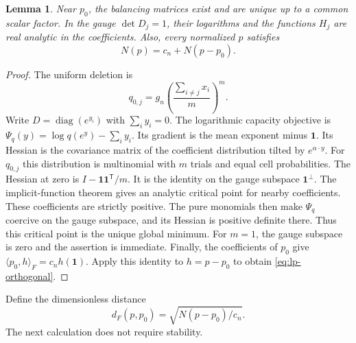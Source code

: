 \documentclass[11pt,a4paper]{article}
\newtheorem{lemma}[theorem]{Lemma}
\theoremstyle{definition}
\theoremstyle{remark}
\newcommand{\T}{\mathsf{T}}
\begin{document}
\begin{lemma}\label{lem:lp-analytic}
Near $p_0$, the balancing matrices exist and are unique up to a common scalar factor.
In the gauge $\det D_j=1$, their logarithms and the functions $H_j$ are real analytic in the coefficients.
Also, every normalized $p$ satisfies
\begin{equation}\label{eq:lp-orthogonal}
 N(p)=c_n+N(p-p_0).
\end{equation}
\end{lemma}
\begin{proof}
The uniform deletion is
\[
 q_{0,j}=g_n\left(\frac{\sum_{i\ne j}x_i}{m}\right)^m.
\]
Write $D=\operatorname{diag}(e^{y_i})$ with $\sum_i y_i=0$.
The logarithmic capacity objective is $\Psi_q(y)=\log q(e^y)-\sum_i y_i$.
Its gradient is the mean exponent minus $\mathbf1$.
Its Hessian is the covariance matrix of the coefficient distribution tilted by $e^{\alpha\cdot y}$.
For $q_{0,j}$ this distribution is multinomial with $m$ trials and equal cell probabilities.
The Hessian at zero is $I-\mathbf1\mathbf1^\T/m$.
It is the identity on the gauge subspace $\mathbf1^\perp$.
The implicit-function theorem gives an analytic critical point for nearby coefficients.
These coefficients are strictly positive.
The pure monomials then make $\Psi_q$ coercive on the gauge subspace, and its Hessian is positive definite there.
Thus this critical point is the unique global minimum.
For $m=1$, the gauge subspace is zero and the assertion is immediate.
Finally, the coefficients of $p_0$ give
$\langle p_0,h\rangle_F=c_nh(\mathbf1)$.
Apply this identity to $h=p-p_0$ to obtain \eqref{eq:lp-orthogonal}.
\end{proof}

Define the dimensionless distance
\[
 d_F(p,p_0)=\sqrt{N(p-p_0)/c_n}.
\]
The next calculation does not require stability.
\end{document}
